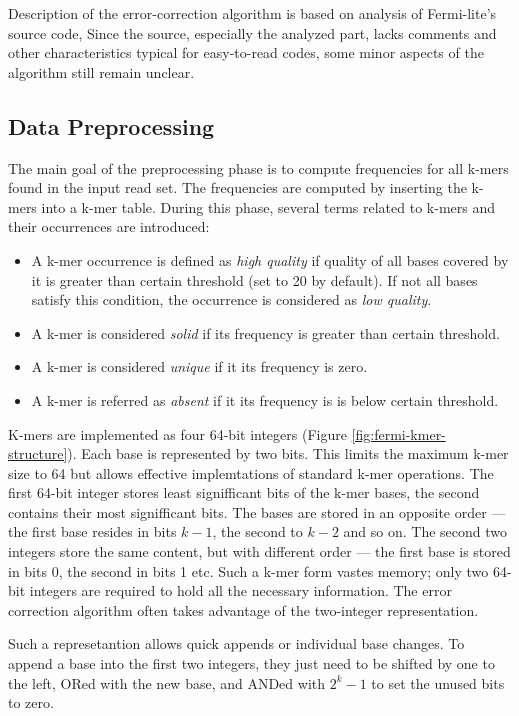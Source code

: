Description of the error-correction algorithm is based on analysis of Fermi-lite's source code, Since the source, especially the analyzed part, lacks comments and other characteristics typical for easy-to-read codes, some minor aspects of the algorithm still remain unclear.

\subsection{Data Preprocessing}
\label{subsec:fermi-data-preprocessing}

The main goal of the preprocessing phase is to compute frequencies for all k-mers found in the input read set. The frequencies are computed by inserting the k-mers into a k-mer table. During this phase, several terms related to k-mers and their occurrences are introduced:
\begin{itemize}
\item A k-mer occurrence is defined as \textit{high quality} if quality of all bases covered by it is greater than certain threshold (set to 20 by default). If not all bases satisfy this condition, the occurrence is considered as \textit{low quality}.
\item A k-mer is considered \textit{solid} if its frequency is greater than certain threshold.
\item A k-mer is considered \textit{unique} if it its frequency is zero.
\item A k-mer is referred as \textit{absent} if it its frequency is is below certain threshold.
\end{itemize}
K-mers are implemented as four 64-bit integers (Figure \ref{fig:fermi-kmer-structure}). Each base is represented by two bits. This limits the maximum k-mer size to 64 but allows effective implemtations of standard k-mer operations. The first 64-bit integer stores least signifficant bits of the k-mer bases, the second contains their most signifficant bits. The bases are stored in an opposite order --- the first base resides in bits $k-1$, the second to $k-2$ and so on. The second two integers store the same content, but with different order --- the first base is stored in bits 0, the second in bits 1 etc. Such a k-mer form vastes memory; only two 64-bit integers are required to hold all the necessary information. The error correction algorithm often takes advantage of the two-integer representation.

Such a represetantion allows quick appends or individual base changes. To append a base into the first two integers, they just need to be shifted by one to the left, ORed with the new base, and ANDed with $2^k-1$ to set the unused bits to zero.

